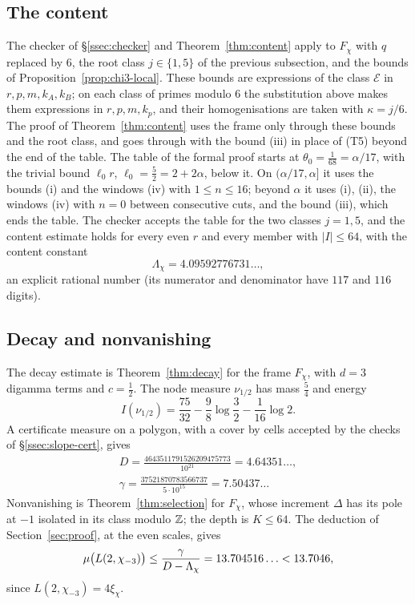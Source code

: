 \subsection{The content}
The checker of \S\ref{ssec:checker} and Theorem~\ref{thm:content} apply to $F_\chi$ with $q$ replaced by $6$, the root
class $j\in\{1,5\}$ of the previous subsection, and the bounds of Proposition~\ref{prop:chi3-local}. These bounds are
expressions of the class $\mathcal E$ in $r,p,m,k_A,k_B$; on each class of primes modulo $6$ the substitution above makes
them expressions in $r,p,m,k_p$, and their homogenisations are taken with $\kappa=j/6$. The proof of
Theorem~\ref{thm:content} uses the frame only through these bounds and the root class, and goes through with the bound
(iii) in place of (T5) beyond the end of the table. The table of the formal proof starts at $\theta_0=\frac1{68}=\alpha/17$, with the trivial bound $\ell_0r$, $\ell_0=\frac52=2+2\alpha$,
below it. On $(\alpha/17,\alpha]$ it uses the bounds (i) and the windows (iv) with $1\le n\le16$; beyond $\alpha$ it uses
(i), (ii), the windows (iv) with $n=0$ between consecutive cuts, and the bound (iii), which ends the table. The checker
accepts the table for the two classes $j=1,5$, and the content estimate holds for every even $r$ and every member with
$|I|\le64$, with the content constant
\[
 \Lambda_\chi=4.09592776731\ldots,
\]
an explicit rational number (its numerator and denominator have $117$ and $116$ digits).

\subsection{Decay and nonvanishing}
The decay estimate is Theorem~\ref{thm:decay} for the frame $F_\chi$, with $d=3$ digamma terms and $c=\frac12$. The node
measure $\nu_{1/2}$ has mass $\frac54$ and energy
\[
 I(\nu_{1/2})=\frac{75}{32}-\frac98\log\frac32-\frac1{16}\log2 .
\]
A certificate measure on a polygon, with a cover by cells accepted by the checks of \S\ref{ssec:slope-cert}, gives
\[
\begin{gathered}
 D=\frac{4643511791526209475773}{10^{21}}=4.64351\ldots,\\ \gamma=\frac{37521870783566737}{5\cdot10^{15}}=7.50437\ldots
\end{gathered}
\]
Nonvanishing is Theorem~\ref{thm:selection} for $F_\chi$, whose increment $\Delta$ has its pole at $-1$ isolated in its
class modulo $\mathbb Z$; the depth is $K\le64$. The deduction of Section~\ref{sec:proof}, at the even scales, gives
\[
 \mu\bigl(L(2,\chi_{-3})\bigr)\le\frac\gamma{D-\Lambda_\chi}=13.704516\ldots<13.7046,
\]
since $L(2,\chi_{-3})=4\xi_\chi$.
